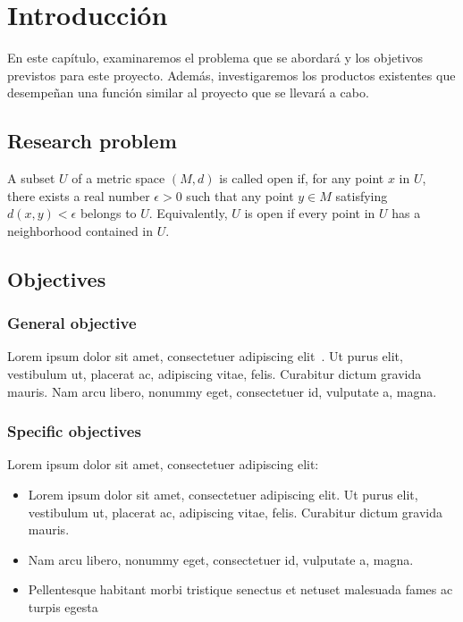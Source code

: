 \chapter{Introducción}\label{ch:Introducción}
En este capítulo, examinaremos el problema que se abordará y los objetivos previstos para este proyecto. Además, investigaremos los productos existentes que desempeñan una función similar al proyecto que se llevará a cabo.

\section{Research problem}
\lipsum[1]
\begin{definition}
A subset $U$ of a metric space $(M, d)$ is called open if, for any point $x$ in $U$, there exists a real number $\epsilon > 0$ such that any point $y\in M$ satisfying $d(x, y) < \epsilon$ belongs to $U$. Equivalently, $U$ is open if every point in $U$ has a neighborhood contained in $U$.
\end{definition}
\lipsum[1]

\section{Objectives}
\subsection{General objective}
Lorem ipsum dolor sit amet, consectetuer adipiscing elit~\cite{adam2015higgs, atlas2014neural, baldi2014searching}. Ut purus elit, vestibulum ut, placerat ac, adipiscing vitae, felis. Curabitur dictum gravida mauris. Nam arcu libero, nonummy eget, consectetuer id, vulputate a, magna.

\subsection{Specific objectives}
Lorem ipsum dolor sit amet, consectetuer adipiscing elit:
\begin{itemize}
    \item Lorem ipsum dolor sit amet, consectetuer adipiscing elit. Ut purus elit, vestibulum ut, placerat ac, adipiscing vitae, felis. Curabitur dictum gravida mauris.
    \item Nam arcu libero, nonummy eget, consectetuer id, vulputate a, magna.
    \item  Pellentesque habitant morbi tristique senectus et netuset malesuada fames ac turpis egesta
\end{itemize}

